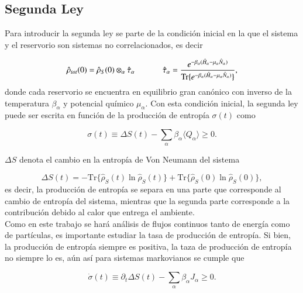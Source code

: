 \subsection{Segunda Ley}
Para introducir la segunda ley se parte de la condición inicial en la que el sistema y el reservorio son sistemas no correlacionados, es decir 

\begin{equation*}
    \hat{\rho}_{tot}(0) = \hat{\rho}_{S}(0)\otimes_{\alpha}\hat{\tau}_{\alpha} \hspace{12mm} \hat{\tau}_{\alpha} = \frac{e^{-\beta_{\alpha}(\hat{H}_{\alpha}-\mu_{\alpha}\hat{N}_{\alpha}) }}{ \text{Tr}\{e^{-\beta_{\alpha}(\hat{H}_{\alpha} - \mu_{\alpha}\hat{N}_{\alpha})}\} },
\end{equation*}
donde cada reservorio se encuentra en equilibrio gran canónico con inverso de la temperatura $\beta_{\alpha}$ y potencial químico $\mu_{\alpha}$. Con esta condición inicial, la segunda ley puede ser escrita en función de la producción de entropía $\sigma(t)$ como \cite{esposito2010entropy}

\begin{equation*}
    \sigma(t) \equiv \Delta S(t) - \sum_{\alpha}\beta_{\alpha}\langle Q_{\alpha}\rangle \geq 0.
\end{equation*}

$\Delta S$ denota el cambio en la entropía de Von Neumann del sistema

\begin{equation*}
    \Delta S(t) = -  \text{Tr}\{\hat{\rho}_{S}(t)\ln \hat{\rho}_{S}(t) \} +  \text{Tr}\{ \hat{\rho}_{S}(0)\ln \hat{\rho}_{S}(0) \},
\end{equation*}
es decir, la producción de entropía se separa en una parte que corresponde al cambio de entropía del sistema, mientras que la segunda parte corresponde a la contribución debido al calor que entrega el ambiente.\\
Como en este trabajo se hará análisis de flujos continuos tanto de energía como de partículas, es importante estudiar la tasa de producción de entropía. Si bien, la producción de entropía siempre es positiva, la taza de producción de entropía no siempre lo es, aún así para sistemas markovianos se cumple que \cite{strasberg2019non}

\begin{equation*}
    \dot{\sigma}(t) \equiv \partial_{t}\Delta S(t) - \sum_{\alpha}\beta_{\alpha}J_{\alpha} \geq 0.
\end{equation*}

